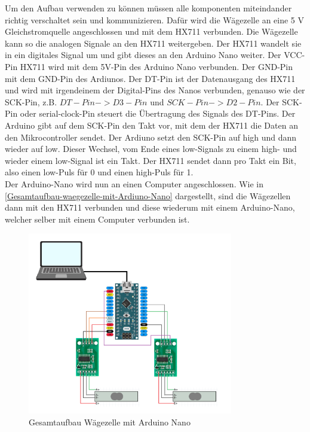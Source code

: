 Um den Aufbau verwenden zu können müssen alle komponenten miteindander richtig verschaltet sein und kommunizieren.
Dafür wird die Wägezelle an eine 5 V Gleichstromquelle angeschlossen und mit dem HX711 verbunden.
Die Wägezelle kann so die analogen Signale an den HX711 weitergeben.
Der HX711 wandelt sie in ein digitales Signal um und gibt dieses an den Arduino Nano weiter.
Der VCC-Pin HX711 wird mit dem 5V-Pin des Arduino Nano verbunden.
Der GND-Pin mit dem GND-Pin des Ardiunos.
Der DT-Pin ist der Datenausgang des HX711 und wird mit irgendeinem der Digital-Pins des Nanos verbunden, genauso wie der SCK-Pin, z.B. $DT-Pin -> D3-Pin$ und $SCK-Pin -> D2-Pin$.
Der SCK-Pin oder serial-clock-Pin steuert die Übertragung des Signals des DT-Pins.
Der Arduino gibt auf dem SCK-Pin den Takt vor, mit dem der HX711 die Daten an den Mikrocontroller sendet.
Der Ardiuno setzt den SCK-Pin auf high und dann wieder auf low.
Dieser Wechsel, vom Ende eines low-Signals zu einem high- und wieder einem low-Signal ist ein Takt.
Der HX711 sendet dann pro Takt ein Bit, also einen low-Puls für 0 und einen high-Puls für 1.
\\
Der Arduino-Nano wird nun an einen Computer angeschlossen.
Wie in \autoref{Gesamtaufbau-waegezelle-mit-Ardiuno-Nano} dargestellt, sind die Wägezellen dann mit den HX711 verbunden und diese wiederum mit einem Arduino-Nano, welcher selber mit einem Computer verbunden ist.
\begin{figure}[h!]
    \centering
    \includegraphics[width=0.8\textwidth]{img/Schaltungs-Aufbau.png}
    \caption{Gesamtaufbau Wägezelle mit Arduino Nano}
    \label{Gesamtaufbau-waegezelle-mit-Arduino-Nano}
\end{figure}
